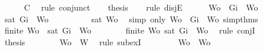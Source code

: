 \begin{isabellebody}
\ \ \ \ \isamarkupfalse%
\ C{}\ \isamarkupfalse%
\ {\isacharparenleft}rule\ conjunct{}{\isacharparenright}\isanewline
\ \ \isamarkupfalse%
\ {\isacharquery}thesis\isanewline
\ \ \isamarkupfalse%
\ {\isacharparenleft}rule\ disjE{\isacharparenright}\isanewline
\ \ \ \ \isamarkupfalse%
\ {\isachardoublequoteopen}Wo\ {\isacharequal}\ {\isacharbraceleft}Gi{\isacharbraceright}\ {\isasymunion}\ Wo{\isacharprime}{\isachardoublequoteclose}\isanewline
\ \ \ \ \isamarkupfalse%
\ \isamarkupfalse%
\ {\isachardoublequoteopen}{\isasymnot}{\isacharparenleft}sat\ {\isacharparenleft}{\isacharbraceleft}Gi{\isacharbraceright}\ {\isasymunion}\ Wo{\isacharprime}{\isacharparenright}{\isacharparenright}{\isachardoublequoteclose}\ \isanewline
\ \ \ \ \ \ \isamarkupfalse%
\ {\isacartoucheopen}{\isasymnot}\ sat\ Wo{\isacartoucheclose}\ \isamarkupfalse%
\ {\isacharparenleft}simp\ only{\isacharcolon}\ {\isacartoucheopen}Wo\ {\isacharequal}\ {\isacharbraceleft}Gi{\isacharbraceright}\ {\isasymunion}\ Wo{\isacharprime}{\isacartoucheclose}\ simp{\isacharunderscore}thms{\isacharparenleft}{}{\isacharparenright}{\isacharparenright}\isanewline
\ \ \ \ \isamarkupfalse%
\ {\isachardoublequoteopen}finite\ Wo{\isacharprime}\ {\isasymand}\ {\isasymnot}{\isacharparenleft}sat\ {\isacharparenleft}{\isacharbraceleft}Gi{\isacharbraceright}\ {\isasymunion}\ Wo{\isacharprime}{\isacharparenright}{\isacharparenright}{\isachardoublequoteclose}\isanewline
\ \ \ \ \ \ \isamarkupfalse%
\ {\isacartoucheopen}finite\ Wo{\isacharprime}{\isacartoucheclose}\ {\isacartoucheopen}{\isasymnot}{\isacharparenleft}sat\ {\isacharparenleft}{\isacharbraceleft}Gi{\isacharbraceright}\ {\isasymunion}\ Wo{\isacharprime}{\isacharparenright}{\isacharparenright}{\isacartoucheclose}\ \isamarkupfalse%
\ {\isacharparenleft}rule\ conjI{\isacharparenright}\isanewline
\ \ \ \ \isamarkupfalse%
\ {\isacharquery}thesis\isanewline
\ \ \ \ \ \ \isamarkupfalse%
\ {\isacartoucheopen}Wo{\isacharprime}\ {\isasymsubseteq}\ W{\isacartoucheclose}\ \isamarkupfalse%
\ {\isacharparenleft}rule\ subexI{\isacharparenright}\isanewline
\ \ \isamarkupfalse%
\isanewline
\ \ \ \ \isamarkupfalse%
\ {\isachardoublequoteopen}Wo\ {\isacharequal}\ Wo{\isacharprime}{\isachardoublequoteclose}\isanewline
\ \ \ \ \isamarkupfalse%
\ \isamarkupfalse%

\end{isabellebody}
